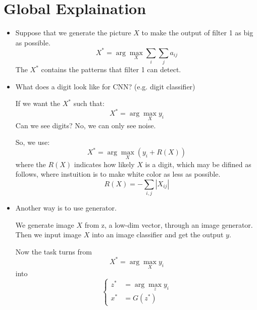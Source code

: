 \documentclass[11pt]{book}
\begin{document}
\section{Global Explaination}
\begin{itemize}
    \item Suppose that we generate the picture $X$ to make the output of filter 1 as big as possible.
    \[
        X^{\ast}=\arg\max_X\sum_i\sum_j a_{ij}
    \]
    The $X^{\ast}$ contains the patterns that filter 1 can detect.
    \item What does a digit look like for CNN? (e.g. digit classifier)\par
    If we want the $X^{\ast}$ such that:
    \begin{displaymath}
        X^{\ast}=\arg\max_X y_i
    \end{displaymath}
    Can we see digits? No, we can only see noise.\par
    So, we use:
    \begin{displaymath}
        X^{\ast}=\arg\max_X (y_i+R(X))
    \end{displaymath}
    where the $R(X)$ indicates how likely $X$ is a digit, which may be difined as follows, where instuition is to make white color as less as possible.
    \begin{displaymath}
        R(X)=-\sum_{i,j}|X_{ij}|
    \end{displaymath}
    \item Another way is to use generator.\par
    We generate image $X$ from z, a low-dim vector, through an image generator. Then we input image $X$ into an image classifier and get the output $y$.\par
    Now the task turns from
    \begin{displaymath}
        X^{\ast}=\arg\max_X y_i
    \end{displaymath}
    into
    \begin{displaymath}
        \begin{cases}
            z^{\ast}&=\arg\max_z y_i\\
            x^{\ast}&=G(z^{\ast})
        \end{cases}
    \end{displaymath}
\end{itemize}
\end{document}
